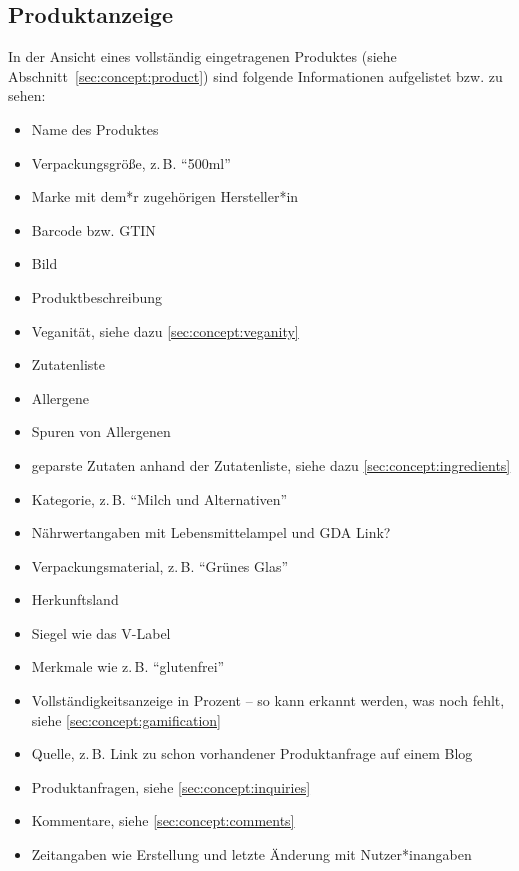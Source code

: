 \subsection{Produktanzeige}
\label{sec:concept:view}

In der Ansicht eines vollständig eingetragenen Produktes
(siehe Abschnitt~\ref{sec:concept:product}) sind folgende Informationen
aufgelistet bzw. zu sehen:

\begin{itemize}
		\item Name des Produktes
		\item Verpackungsgröße, z.\,B. "`500ml"'
		\item Marke mit dem*r zugehörigen Hersteller*in
		\item Barcode bzw. \ac{GTIN} %
		\item Bild
		\item Produktbeschreibung
		\item Veganität, siehe dazu \ref{sec:concept:veganity}
		\item Zutatenliste
		\item Allergene
		\item Spuren von Allergenen
		\item geparste Zutaten anhand der Zutatenliste, siehe dazu
				\ref{sec:concept:ingredients}
		\item Kategorie, z.\,B. "`Milch und Alternativen"'
		\item Nährwertangaben mit Lebensmittelampel und \ac{GDA} %
Link?
		\item Verpackungsmaterial, z.\,B. "`Grünes Glas"'
		\item Herkunftsland
		\item Siegel wie das V-Label 
		\item Merkmale wie z.\,B. "`glutenfrei"'
		\item Vollständigkeitsanzeige in Prozent -- so kann erkannt
				werden, was noch fehlt, siehe 
\ref{sec:concept:gamification} %
		\item Quelle, z.\,B. Link zu schon vorhandener Produktanfrage
				auf einem Blog
		\item Produktanfragen, siehe \ref{sec:concept:inquiries}
		\item Kommentare, siehe \ref{sec:concept:comments}
		\item Zeitangaben wie Erstellung und letzte Änderung mit
				Nutzer*inangaben
\end{itemize}

